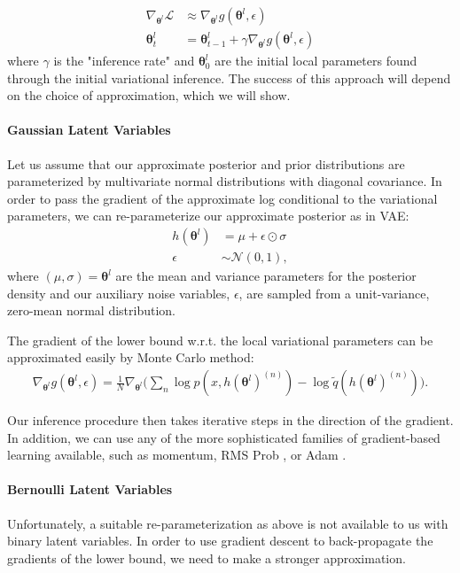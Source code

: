 \documentclass{article} %
\newcommand{\vects}[1]{\boldsymbol{#1}}
\newcommand{\TT}[0]{\vects{\theta}}
\newcommand{\grad}[0]{\nabla}
\newcommand{\LL}[0]{\mathcal{L}}
\newcommand{\NN}[0]{\mathcal{N}}
\begin{document}
\begin{align}
\grad_{\TT^l} \LL &\approx \grad_{\TT^l} g(\TT^l, \epsilon) \nonumber \\
\TT^l_t &= \TT^l_{t-1} + \gamma \grad_{\TT^l} g(\TT^l, \epsilon)
\end{align}
where $\gamma$ is the "inference rate" and $\TT^l_0$ are the initial local
parameters found through the initial variational inference. The success of this
approach will depend on the choice of approximation, which we will show.

\paragraph{Gaussian Latent Variables}

Let us assume that our approximate posterior and prior distributions are
parameterized by multivariate normal distributions with diagonal covariance. In
order to pass the gradient of the approximate log conditional to the variational
parameters, we can re-parameterize our approximate posterior as in VAE:
\begin{align}
h(\TT^l) &= \mu + \epsilon \odot \sigma \nonumber \\
\epsilon &\sim \NN(0, 1),
\end{align}
where $(\mu, \sigma) = \TT^l$ are the mean and variance parameters for the
posterior density and our auxiliary noise variables, $\epsilon$, are sampled
from a unit-variance, zero-mean normal distribution.

The gradient of the lower bound w.r.t. the local variational parameters can be
approximated easily by Monte Carlo method:
\begin{align}
\grad_{\TT^l} g(\TT^l, \epsilon) = \frac{1}{N} \grad_{\TT^l} \bigg(\sum_n \log p(x, h(\TT^l)^{(n)}) - \log \tilde{q}(h(\TT^l)^{(n)})\bigg).
\end{align}

Our inference procedure then takes iterative steps in the direction of the gradient. In addition, we can use any of the more sophisticated families of gradient-based learning available, such as momentum, RMS Prob \citep{Hinton-Coursera2012}, or Adam \citep{kingma2014method}.

\paragraph{Bernoulli Latent Variables}
Unfortunately, a suitable re-parameterization as above is not available to us
with binary latent variables. In order to use gradient descent to back-propagate
the gradients of the lower bound, we need to make a stronger approximation. 
\end{document}
